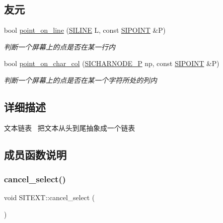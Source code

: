 \subsection*{友元}
\begin{DoxyCompactItemize}
\item 
bool \hyperlink{class_s_i_t_e_x_t_ae39165f0f00583edee6fe18ea6bdf5e3}{point\+\_\+on\+\_\+line} (\hyperlink{struct_s_i_r_a_n_g_e}{S\+I\+L\+I\+NE} L, const \hyperlink{struct_s_i_p_o_i_n_t}{S\+I\+P\+O\+I\+NT} \&P)
\begin{DoxyCompactList}\small\item\em 判断一个屏幕上的点是否在某一行内~\newline
\end{DoxyCompactList}\item 
bool \hyperlink{class_s_i_t_e_x_t_a98cfecde826e07d0286c4e279554d1fa}{point\+\_\+on\+\_\+char\+\_\+col} (\hyperlink{class_s_i_c_h_a_r_n_o_d_e}{S\+I\+C\+H\+A\+R\+N\+O\+D\+E\+\_\+P} np, const \hyperlink{struct_s_i_p_o_i_n_t}{S\+I\+P\+O\+I\+NT} \&P)
\begin{DoxyCompactList}\small\item\em 判断一个屏幕上的点是否在某一个字符所处的列内~\newline
\end{DoxyCompactList}\end{DoxyCompactItemize}


\subsection{详细描述}
文本链表~\newline
把文本从头到尾抽象成一个链表 

\subsection{成员函数说明}
\mbox{\label{class_s_i_t_e_x_t_a3a942ca324f4c37a4d747ba7a91a293b}} 
\subsubsection{\texorpdfstring{cancel\+\_\+select()}{cancel\_select()}}
{\footnotesize\ttfamily void S\+I\+T\+E\+X\+T\+::cancel\+\_\+select (\begin{DoxyParamCaption}{ }\end{DoxyParamCaption})\hspace{0.3cm}{\ttfamily [inline]}}



